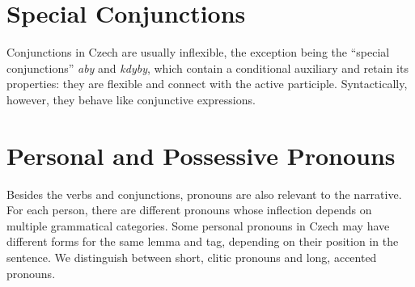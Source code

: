 \section{Special Conjunctions}

Conjunctions in Czech are usually inflexible, the exception being the ``special conjunctions'' \emph{aby} and \emph{kdyby}, which contain a conditional auxiliary and retain its properties: they are flexible and connect with the active participle. Syntactically, however, they behave like conjunctive expressions. \cite{Prejzova2013thesis}

\section{Personal and Possessive Pronouns}

Besides the verbs and conjunctions, pronouns are also relevant to the narrative. For each person, there are different pronouns whose inflection depends on multiple grammatical categories. Some personal pronouns in Czech may have different forms for the same lemma and tag, depending on their position in the sentence. We distinguish between short, clitic pronouns and long, accented pronouns.

